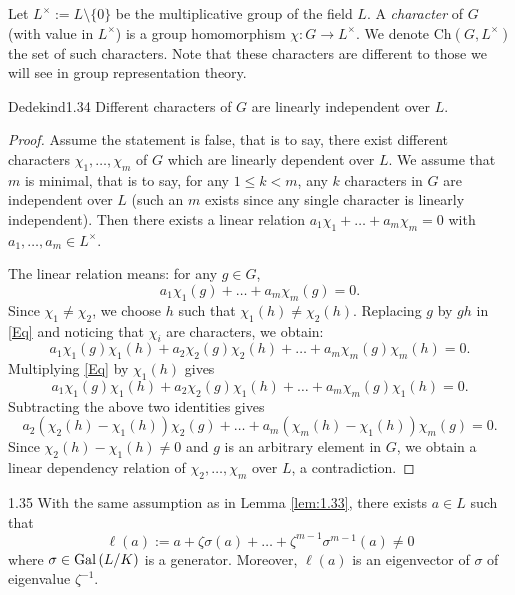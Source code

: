 \documentclass[twoside = false,	%
		headsepline,		%
		parskip = true,
		]{scrbook}						%
\begin{document}
    Let $L^\times:=L\setminus\{0\}$ be the multiplicative group of the field $L$. A \emph{character} of $G$ (with value in $L^\times$) is a group homomorphism $\chi:G\to L^\times$. We denote $\mathrm{Ch}(G,L^\times)$ the set of such characters. Note that these characters are different to those we will see in group representation theory.
    
    \begin{lemma}{Dedekind}{1.34}
        Different characters of $G$ are linearly independent over $L$.
    \end{lemma}

    \begin{proof}
        Assume the statement is false, that is to say, there exist different characters $\chi_1,\ldots,\chi_m$ of $G$ which are linearly dependent over $L$. We assume that $m$ is minimal, that is to say, for any $1\leq k<m$, any $k$ characters in $G$ are independent over $L$ (such an $m$ exists since any single character is linearly independent). Then there exists a linear relation $a_1\chi_1+\ldots+a_m\chi_m=0$ with $a_1,\ldots,a_m\in L^\times$. 

        The linear relation means: for any $g\in G$, 
        \begin{equation}\label{Eq}
        a_1\chi_1(g)+\ldots+a_m\chi_m(g)=0.
        \end{equation} 
        Since $\chi_1\neq \chi_2$, we choose $h$ such that $\chi_1(h)\neq\chi_2(h)$. Replacing $g$ by $gh$ in \eqref{Eq} and noticing that $\chi_i$ are characters, we obtain:
        $$a_1\chi_1(g)\chi_1(h)+a_2\chi_2(g)\chi_2(h)+\ldots+a_m\chi_m(g)\chi_m(h)=0.$$
        Multiplying \eqref{Eq} by $\chi_1(h)$ gives
        $$a_1\chi_1(g)\chi_1(h)+a_2\chi_2(g)\chi_1(h)+\ldots+a_m\chi_m(g)\chi_1(h)=0.$$
        Subtracting the above two identities gives
        $$a_2(\chi_2(h)-\chi_1(h))\chi_2(g)+\ldots+a_m(\chi_m(h)-\chi_1(h))\chi_m(g)=0.$$
        Since $\chi_2(h)-\chi_1(h)\neq 0$ and $g$ is an arbitrary element in $G$, we obtain a linear dependency relation of $\chi_2,\ldots,\chi_m$ over $L$, a contradiction.
    \end{proof}


    \begin{corollary}{}{1.35}
        With the same assumption as in Lemma \ref{lem:1.33}, there exists $a\in L$ such that $$\ell(a):=a+\zeta\sigma(a)+\ldots+\zeta^{m-1}\sigma^{m-1}(a)\neq 0$$
        where $\sigma\in\mathrm{Gal}\left( L/K\right)$ is a generator. Moreover, $\ell(a)$ is an eigenvector of $\sigma$ of eigenvalue $\zeta^{-1}$.
    \end{corollary}
\end{document}
